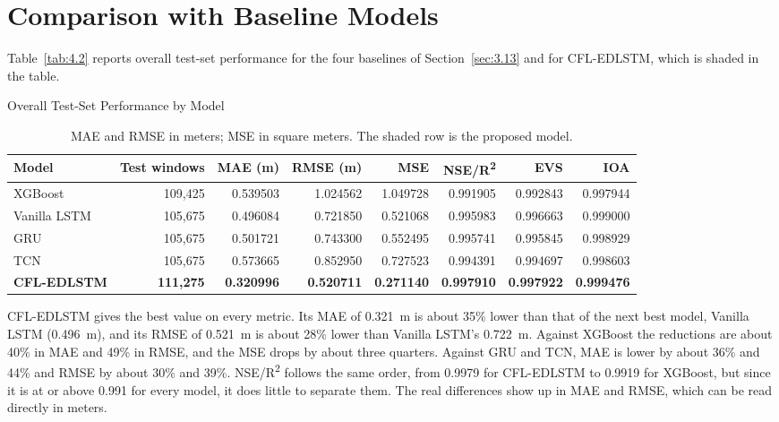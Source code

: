\section{Comparison with Baseline Models}
\label{sec:4.5}

Table~\ref{tab:4.2} reports overall test-set performance for the four baselines
of Section~\ref{sec:3.13} and for CFL-EDLSTM, which is shaded in the table.

\begin{table}[htbp]
  \centering
  \caption{Overall Test-Set Performance by Model}
  \label{tab:4.2}
  \label{tab:testwindows}
  \footnotesize
  \setlength{\tabcolsep}{4pt}
  \begin{tabular}{@{}l r r r r r r r@{}}
    \toprule
    \textbf{Model} & \textbf{Test windows} & \textbf{MAE (m)} & \textbf{RMSE (m)} & \textbf{MSE} & \textbf{NSE/R\textsuperscript{2}} & \textbf{EVS} & \textbf{IOA} \\
    \midrule
    XGBoost & 109{,}425 & 0.539503 & 1.024562 & 1.049728 & 0.991905 & 0.992843 & 0.997944 \\
    Vanilla LSTM & 105{,}675 & 0.496084 & 0.721850 & 0.521068 & 0.995983 & 0.996663 & 0.999000 \\
    GRU & 105{,}675 & 0.501721 & 0.743300 & 0.552495 & 0.995741 & 0.995845 & 0.998929 \\
    TCN & 105{,}675 & 0.573665 & 0.852950 & 0.727523 & 0.994391 & 0.994697 & 0.998603 \\
    \midrule
    \rowcolor{gray!15}
    \textbf{CFL-EDLSTM} & \textbf{111{,}275} & \textbf{0.320996} & \textbf{0.520711} & \textbf{0.271140} & \textbf{0.997910} & \textbf{0.997922} & \textbf{0.999476} \\
    \bottomrule
  \end{tabular}
  \caption*{\footnotesize MAE and RMSE in meters; MSE in square meters. The shaded row is the proposed model.}
\end{table}

CFL-EDLSTM gives the best value on every metric. Its MAE of 0.321~m is about
35\% lower than that of the next best model, Vanilla LSTM (0.496~m), and its
RMSE of 0.521~m is about 28\% lower than Vanilla LSTM's 0.722~m. Against XGBoost
the reductions are about 40\% in MAE and 49\% in RMSE, and the MSE drops by about
three quarters. Against GRU and TCN, MAE is lower by about 36\% and 44\% and RMSE
by about 30\% and 39\%. NSE/R\textsuperscript{2} follows the same order, from
0.9979 for CFL-EDLSTM to 0.9919 for XGBoost, but since it is at or above 0.991
for every model, it does little to separate them. The real differences show up
in MAE and RMSE, which can be read directly in meters.

